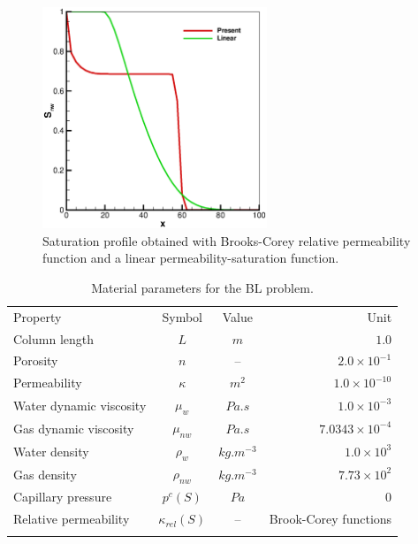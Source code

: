 \begin{figure}[!tbh]
\begin{center}
\includegraphics[width=0.6\textwidth]{chapter_13/figures/fig_13_1_8}
\end{center}
\caption{Saturation profile obtained with Brooks-Corey relative permeability function and a linear permeability-saturation function.}
\label{bl:comparison2}
\end{figure}

\begin{table}[!htb]
\begin{tabular}{lccr}
\hline\noalign{\smallskip}
Property & Symbol & Value & Unit \\
\noalign{\smallskip}\hline\noalign{\smallskip}
Column length & $L$ & $m$ & $1.0$  \\
Porosity & $n$ & -- & $2.0\times10^{-1}$ \\
Permeability & $\kappa$ & $ m^2$ & $1.0\times 10^{-10}$ \\
Water dynamic viscosity &  $\mu_w$ & $Pa.s$ & $1.0\times10^{-3}$ \\
Gas dynamic viscosity & $\mu_{nw}$ & $Pa.s$ & $7.0343\times10^{-4}$ \\
Water density &  $\rho_w$ &$kg.m^{-3}$ & $1.0\times10^{3}$ \\
Gas density &  $\rho_{nw}$ & $kg.m^{-3}$ & $7.73\times10^{2}$ \\
Capillary pressure & $p^c(S)$ & $Pa$ & 0 \\
Relative permeability & $\kappa_{rel}(S)$ & -- & Brook-Corey functions \\
\noalign{\smallskip}\hline
\end{tabular}
\caption{Material parameters for the BL problem.}
\end{table}

